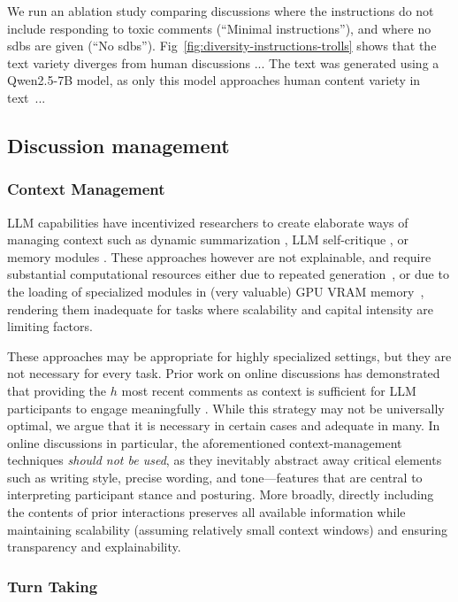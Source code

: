 We run an ablation study comparing discussions where the instructions do not include responding to toxic comments (``Minimal instructions''), and where no \acp{sdb} are given (``No \acp{sdb}''). Fig~\ref{fig:diversity-instructions-trolls} shows that the text variety diverges from human discussions ... The text was generated using a Qwen2.5-7B model, as only this model approaches human content variety in text~...


\subsection{Discussion management}

\subsubsection{Context Management}
LLM capabilities have incentivized researchers to create elaborate ways of managing context such as dynamic summarization \cite{balog_2024,park2023game}, LLM self-critique \cite{yu_2024_fincon}, or memory modules \cite{Vezhnevets2023GenerativeAM}. These approaches however are not explainable, and require substantial computational resources either due to repeated generation~\cite{balog_2024,adornetto2025_gabms}, or due to the loading of specialized modules in (very valuable) GPU VRAM memory~\cite{Vezhnevets2023GenerativeAM}, rendering them inadequate for tasks where scalability and capital intensity are limiting factors.

These approaches may be appropriate for highly specialized settings, but they are not necessary for every task. Prior work on online discussions has demonstrated that providing the $h$ most recent comments as context is sufficient for LLM participants to engage meaningfully \cite{pavlopoulos_2020_toxicity}. While this strategy may not be universally optimal, we argue that it is necessary in certain cases and adequate in many. In online discussions in particular, the aforementioned context-management techniques \emph{should not be used}, as they inevitably abstract away critical elements such as writing style, precise wording, and tone—features that are central to interpreting participant stance and posturing. More broadly, directly including the contents of prior interactions preserves all available information while maintaining scalability (assuming relatively small context windows) and ensuring transparency and explainability.


\subsubsection{Turn Taking}

